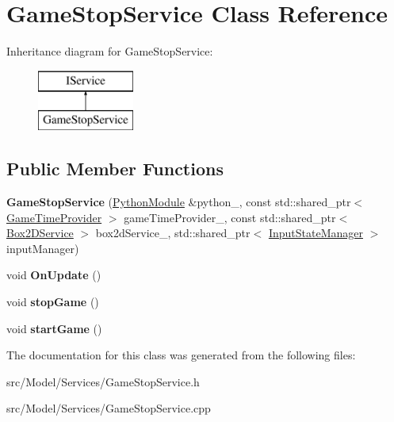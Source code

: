 \hypertarget{classGameStopService}{}\section{Game\+Stop\+Service Class Reference}
\label{classGameStopService}
Inheritance diagram for Game\+Stop\+Service\+:\begin{figure}[H]
\begin{center}
\leavevmode
\includegraphics[height=2.000000cm]{classGameStopService}
\end{center}
\end{figure}
\subsection*{Public Member Functions}
\begin{DoxyCompactItemize}
\item 
{\bfseries Game\+Stop\+Service} (\hyperlink{classPythonModule}{Python\+Module} \&python\+\_\+, const std\+::shared\+\_\+ptr$<$ \hyperlink{classGameTimeProvider}{Game\+Time\+Provider} $>$ game\+Time\+Provider\+\_\+, const std\+::shared\+\_\+ptr$<$ \hyperlink{classBox2DService}{Box2\+D\+Service} $>$ box2d\+Service\+\_\+, std\+::shared\+\_\+ptr$<$ \hyperlink{classInputStateManager}{Input\+State\+Manager} $>$ input\+Manager)\hypertarget{classGameStopService_af17fa924810d813d0f542239f6e84ebe}{}\label{classGameStopService_af17fa924810d813d0f542239f6e84ebe}

\item 
void {\bfseries On\+Update} ()\hypertarget{classGameStopService_a8a6a9b15fc8984ad0196781f0c177188}{}\label{classGameStopService_a8a6a9b15fc8984ad0196781f0c177188}

\item 
void {\bfseries stop\+Game} ()\hypertarget{classGameStopService_ab66aee8a96a4758ee1ff2df32606420e}{}\label{classGameStopService_ab66aee8a96a4758ee1ff2df32606420e}

\item 
void {\bfseries start\+Game} ()\hypertarget{classGameStopService_a7b42f3c27d5d707468f42f143da5e9ce}{}\label{classGameStopService_a7b42f3c27d5d707468f42f143da5e9ce}

\end{DoxyCompactItemize}


The documentation for this class was generated from the following files\+:\begin{DoxyCompactItemize}
\item 
src/\+Model/\+Services/Game\+Stop\+Service.\+h\item 
src/\+Model/\+Services/Game\+Stop\+Service.\+cpp\end{DoxyCompactItemize}
